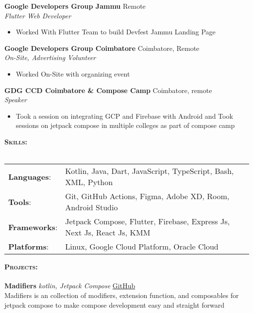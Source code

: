 \documentclass[a4paper]{article}
\newcommand{\lineunder} {
    \vspace*{-8pt} \\
    \hspace*{-18pt} \hrulefill \\
}
\newcommand{\header} [1] {
    {\hspace*{-18pt}\vspace*{6pt} \textsc{#1} }
    \vspace*{-6pt} \lineunder
}
\begin{document}
\textbf{Google Developers Group Jammu} \hfill Remote\\
\textit{Flutter Web Developer}\\
\vspace{-1mm}
\begin{itemize} \itemsep 1pt
	\item Worked With Flutter Team to build Devfest Jammu Landing Page
\end{itemize}

\textbf{Google Developers Group Coimbatore} \hfill Coimbatore, Remote\\
\textit{On-Site, Advertising Volunteer}\\
\vspace{-1mm}
\begin{itemize} \itemsep 1pt
	\item Worked On-Site with organizing event
\end{itemize}

\textbf{GDG CCD Coimbatore \& Compose Camp} \hfill Coimbatore, remote\\
\textit{Speaker}\\
\vspace{-1mm}
\begin{itemize} \itemsep 1pt
	\item Took a session on integrating GCP and Firebase with Android and Took sessions on jetpack compose in multiple colleges as part of compose camp
\end{itemize}

\header{\textbf{Skills:}}
\begin{tabular}{ l l }
	{\textbf{Languages}}:  
        & Kotlin, Java, Dart, JavaScript, TypeScript, Bash, XML, Python          \\
	{\textbf{Tools}}:   
        & Git, GitHub Actions, Figma, Adobe XD, Room, Android Studio            \\
	{\textbf{Frameworks}}:
        & Jetpack Compose, Flutter, Firebase, Express Js, Next Js, React Js, KMM \\
	{\textbf{Platforms}}: 
        & Linux, Google Cloud Platform, Oracle Cloud                             \\
\end{tabular}
\vspace{2mm}

\header{ \textbf{Projects:}}
{\textbf{Madifiers}} {\sl kotlin, Jetpack Compose}
    \hfill \href{https://github.com/MadFlasheroo7/Madifiers}{GitHub}\\
    Madifiers is an collection of modifiers, extension function, and composables for jetpack compose to make compose development easy and straight forward 
\vspace*{2mm}
\end{document}
